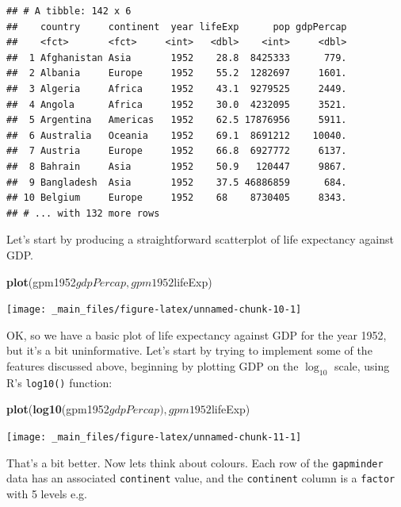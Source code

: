 \documentclass[]{book}
\newenvironment{Shaded}{\begin{snugshade}}{\end{snugshade}}
\newcommand{\KeywordTok}[1]{\textcolor[rgb]{0.13,0.29,0.53}{\textbf{{#1}}}}
\newcommand{\NormalTok}[1]{{#1}}
\theoremstyle{definition}
\theoremstyle{definition}
\theoremstyle{definition}
\theoremstyle{remark}
\begin{document}
\begin{verbatim}
## # A tibble: 142 x 6
##    country     continent  year lifeExp      pop gdpPercap
##    <fct>       <fct>     <int>   <dbl>    <int>     <dbl>
##  1 Afghanistan Asia       1952    28.8  8425333      779.
##  2 Albania     Europe     1952    55.2  1282697     1601.
##  3 Algeria     Africa     1952    43.1  9279525     2449.
##  4 Angola      Africa     1952    30.0  4232095     3521.
##  5 Argentina   Americas   1952    62.5 17876956     5911.
##  6 Australia   Oceania    1952    69.1  8691212    10040.
##  7 Austria     Europe     1952    66.8  6927772     6137.
##  8 Bahrain     Asia       1952    50.9   120447     9867.
##  9 Bangladesh  Asia       1952    37.5 46886859      684.
## 10 Belgium     Europe     1952    68    8730405     8343.
## # ... with 132 more rows
\end{verbatim}

Let's start by producing a straightforward scatterplot of life
expectancy against GDP.

\begin{Shaded}
\begin{Highlighting}[]
\KeywordTok{plot}\NormalTok{(gpm1952$gdpPercap, gpm1952$lifeExp)}
\end{Highlighting}
\end{Shaded}

\begin{center}\texttt{[image: \_main\_files/figure-latex/unnamed-chunk-10-1]} \end{center}

OK, so we have a basic plot of life expectancy against GDP for the year
1952, but it's a bit uninformative. Let's start by trying to implement
some of the features discussed above, beginning by plotting GDP on the
\(\log_{10}\) scale, using R's \texttt{log10()} function:

\begin{Shaded}
\begin{Highlighting}[]
\KeywordTok{plot}\NormalTok{(}\KeywordTok{log10}\NormalTok{(gpm1952$gdpPercap), gpm1952$lifeExp)}
\end{Highlighting}
\end{Shaded}

\begin{center}\texttt{[image: \_main\_files/figure-latex/unnamed-chunk-11-1]} \end{center}

That's a bit better. Now lets think about colours. Each row of the
\texttt{gapminder} data has an associated \texttt{continent} value, and
the \texttt{continent} column is a \texttt{factor} with 5 levels e.g.
\end{document}
